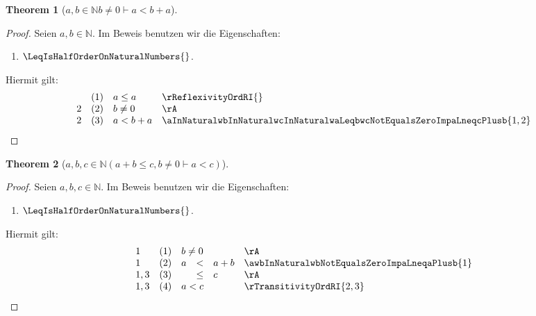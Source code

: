 \documentclass{book}
\theoremstyle{plain}
\newtheorem{theorem}{Theorem}
\theoremstyle{remark}
\theoremstyle{definition}
\begin{document}
\label{awbInNaturalbNotEqualsZeroImpaLneqbPlusa}
\begin{theorem}[\(a,b\in\mathbb{N}b\neq 0\vdash a<b+a\)]
\end{theorem}
\begin{proof}
        Seien \(a,b\in\mathbb{N}\). Im Beweis benutzen wir die Eigenschaften:
\begin{enumerate}
    \item \(\LeqIsHalfOrderOnNaturalNumbers{}\).
\end{enumerate}
Hiermit gilt:
\[
\begin{array}{llll}
              & (1) & a\leq a  & \rReflexivityOrdRI{} \\
            2 & (2) & b\neq 0  & \rA \\
            2 & (3) & a<b+a & \aInNaturalwbInNaturalwcInNaturalwaLeqbwcNotEqualsZeroImpaLneqcPlusb{1,2} \\
\end{array}
\]
\end{proof}

\label{awbwcInNaturalLpaPlusbLeqcwbNotEqualsZeroImpaLneqc}
\begin{theorem}[\(a,b,c\in\mathbb{N}(a+b\leq c,b\neq 0 \vdash a<c)\)]
\end{theorem}
\begin{proof}
        Seien \(a,b,c\in\mathbb{N}\). Im Beweis benutzen wir die Eigenschaften:
\begin{enumerate}
    \item \(\LeqIsHalfOrderOnNaturalNumbers{}\).
\end{enumerate}
Hiermit gilt:
\[
\begin{array}{llclll}
            1 & (1) & \multicolumn{3}{l}{b\neq 0}  & \rA \\
            1 & (2) & a&<& a+b  & \awbInNaturalwbNotEqualsZeroImpaLneqaPlusb{1} \\
            1,3 & (3) &  &\leq &c & \rA \\
            1,3 & (4) & \multicolumn{3}{l}{a<c} & \rTransitivityOrdRI{2,3} \\
\end{array}
\]
\end{proof}
\end{document}

